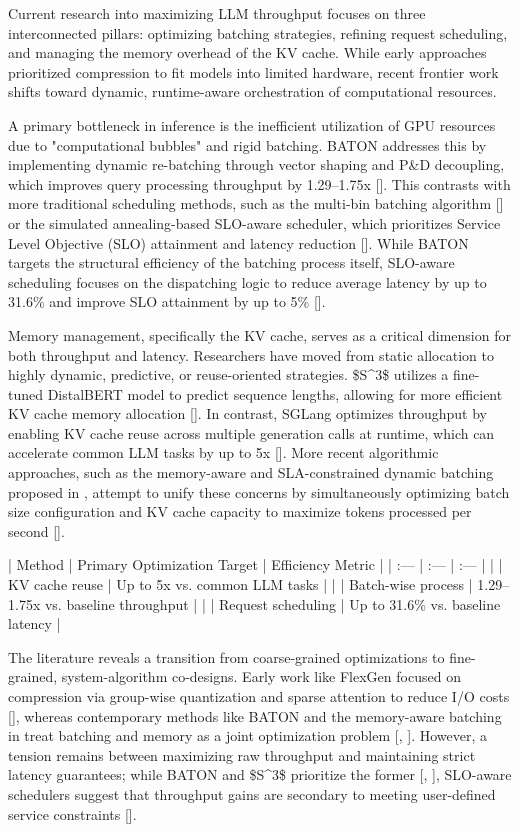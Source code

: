 \documentclass[11pt]{article}
\begin{document}
Current research into maximizing LLM throughput focuses on three interconnected pillars: optimizing batching strategies, refining request scheduling, and managing the memory overhead of the KV cache. While early approaches prioritized compression to fit models into limited hardware, recent frontier work shifts toward dynamic, runtime-aware orchestration of computational resources.

A primary bottleneck in inference is the inefficient utilization of GPU resources due to "computational bubbles" and rigid batching. BATON addresses this by implementing dynamic re-batching through vector shaping and P\&D decoupling, which improves query processing throughput by 1.29–1.75x [\citep{2410.18701}]. This contrasts with more traditional scheduling methods, such as the multi-bin batching algorithm [\citep{2412.04504}] or the simulated annealing-based SLO-aware scheduler, which prioritizes Service Level Objective (SLO) attainment and latency reduction [\citep{2504.14966}]. While BATON targets the structural efficiency of the batching process itself, SLO-aware scheduling focuses on the dispatching logic to reduce average latency by up to 31.6\% and improve SLO attainment by up to 5\% [\citep{2504.14966}].

Memory management, specifically the KV cache, serves as a critical dimension for both throughput and latency. Researchers have moved from static allocation to highly dynamic, predictive, or reuse-oriented strategies. \$S\textasciicircum{}3\$ utilizes a fine-tuned DistalBERT model to predict sequence lengths, allowing for more efficient KV cache memory allocation [\citep{2306.06000}]. In contrast, SGLang optimizes throughput by enabling KV cache reuse across multiple generation calls at runtime, which can accelerate common LLM tasks by up to 5x [\citep{2312.07104}]. More recent algorithmic approaches, such as the memory-aware and SLA-constrained dynamic batching proposed in \citep{2503.05248}, attempt to unify these concerns by simultaneously optimizing batch size configuration and KV cache capacity to maximize tokens processed per second [\citep{2503.05248}].

| Method | Primary Optimization Target | Efficiency Metric |
| :--- | :--- | :--- |
| \citep{2312.07104} | KV cache reuse | Up to 5x vs. common LLM tasks |
| \citep{2410.18701} | Batch-wise process | 1.29–1.75x vs. baseline throughput |
| \citep{2504.14966} | Request scheduling | Up to 31.6\% vs. baseline latency |

The literature reveals a transition from coarse-grained optimizations to fine-grained, system-algorithm co-designs. Early work like FlexGen focused on compression via group-wise quantization and sparse attention to reduce I/O costs [\citep{2303.06865}], whereas contemporary methods like BATON and the memory-aware batching in \citep{2503.05248} treat batching and memory as a joint optimization problem [\citep{2410.18701}, \citep{2503.05248}]. However, a tension remains between maximizing raw throughput and maintaining strict latency guarantees; while BATON and \$S\textasciicircum{}3\$ prioritize the former [\citep{2410.18701}, \citep{2306.06000}], SLO-aware schedulers suggest that throughput gains are secondary to meeting user-defined service constraints [\citep{2504.14966}].
\end{document}
